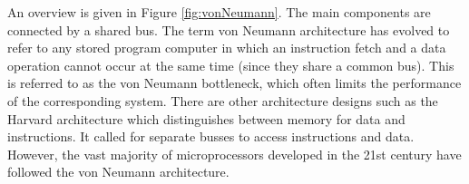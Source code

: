 \documentclass[letterpaper, 12pt]{book}
\newcommand*{\myaside}[2]{\noindent
    \colorbox{red!10}{\noindent
        \begin{minipage}{\textwidth}
            \textbf{Aside: #1} 
            #2
        \end{minipage}
    }
}
\begin{document}
An overview is given in Figure \ref{fig:vonNeumann}. The main components are connected by a shared bus. %
%
The term \gls{von Neumann architecture} has evolved to refer to any \gls{stored program computer} in which an 
instruction fetch and a data operation cannot occur at the same time (since they share a common bus). 
This is referred to as the von Neumann bottleneck, which often limits the performance of the corresponding 
system. %
There are other architecture designs such as the \gls{Harvard architecture} which distinguishes between 
memory for data and instructions. It called for separate busses to access instructions and data. However, 
the vast majority of microprocessors developed in the 21st century have followed the \gls{von Neumann architecture}. %
%

\end{document}
